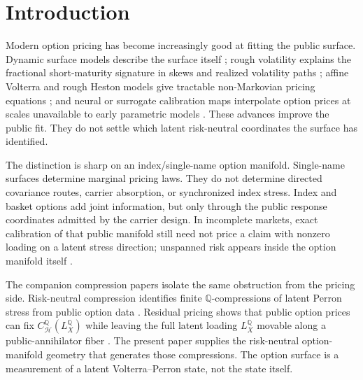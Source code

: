 \documentclass[11pt,a4paper]{amsart}
\theoremstyle{plain}
\theoremstyle{definition}
\theoremstyle{remark}
\newcommand{\QQ}{\mathbb{Q}}
\newcommand{\cH}{\mathcal{H}}
\begin{document}
\maketitle


\section{Introduction}\label{sec:intro}

Modern option pricing has become increasingly good at fitting the public surface.  Dynamic
surface models describe the surface itself \cite{contDaFonseca2002}; rough volatility explains the
fractional short-maturity signature in skews and realized volatility paths
\cite{bayer2016pricing,gatheralJaissonRosenbaum2018}; affine Volterra and rough Heston models give
tractable non-Markovian pricing equations \cite{elEuchRosenbaum2019,abijaber2019affine,abiJaberElEuch2019};
and neural or surrogate calibration maps interpolate option prices at scales unavailable to early
parametric models \cite{horvathMuguruzaTomas2021}.  These advances improve the public fit.  They
do not settle which latent risk-neutral coordinates the surface has identified.

The distinction is sharp on an index/single-name option manifold.  Single-name surfaces determine
marginal pricing laws.  They do not determine directed covariance routes, carrier absorption, or
synchronized index stress.  Index and basket options add joint information, but only through the
public response coordinates admitted by the carrier design.  In incomplete markets, exact
calibration of that public manifold still need not price a claim with nonzero loading on a latent
stress direction; unspanned risk appears inside the option manifold itself
\cite{collinDufresneGoldstein2002,follmerSondermann1986,schweizer1992meanVariance}.

The companion compression papers isolate the same obstruction from the pricing side.
Risk-neutral compression identifies finite \(\QQ\)-compressions of latent Perron stress from public
option data \cite{vidal2026compression}.  Residual pricing shows that public option prices can fix
\(C_{\cH}^{\QQ}(L_X^\QQ)\) while leaving the full latent loading \(L_X^\QQ\) movable along a
public-annihilator fiber \cite{vidal2026pricing}.  The present paper supplies the risk-neutral
option-manifold geometry that generates those compressions.  The option surface is a measurement
of a latent Volterra--Perron state, not the state itself.
\end{document}
